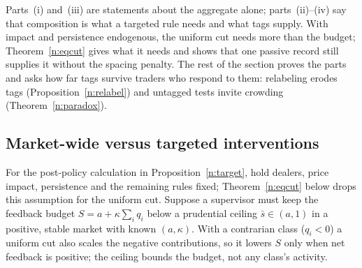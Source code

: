 \documentclass[11pt,letterpaper]{article}
\theoremstyle{definition}
\begin{document}
Parts~(i) and~(iii) are statements about the aggregate alone; parts~(ii)--(iv) say that composition is what a targeted rule needs and what tags supply. With impact and persistence endogenous, the uniform cut needs more than the budget; Theorem~\ref{n:eqcut} gives what it needs and shows that one passive record still supplies it without the spacing penalty. The rest of the section proves the parts and asks how far tags survive traders who respond to them: relabeling erodes tags (Proposition~\ref{n:relabel}) and untagged tests invite crowding (Theorem~\ref{n:paradox}).

\subsection{Market-wide versus targeted interventions}

For the post-policy calculation in Proposition~\ref{n:target}, hold dealers, price impact, persistence and the remaining rules fixed; Theorem~\ref{n:eqcut} below drops this assumption for the uniform cut. Suppose a supervisor must keep the feedback budget $S = a + \kappa \sum_i q_i$ below a prudential ceiling $\bar{s} \in (a, 1)$ in a positive, stable market with known $(a, \kappa)$. With a contrarian class ($q_i < 0$) a uniform cut also scales the negative contributions, so it lowers $S$ only when net feedback is positive; the ceiling bounds the budget, not any class's activity.
\end{document}
